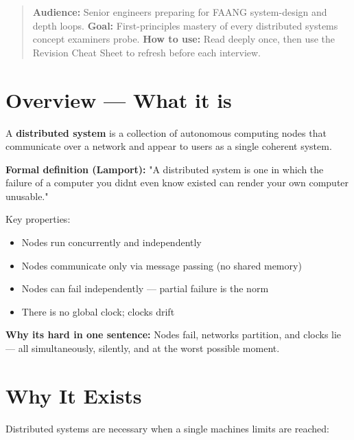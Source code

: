 \documentclass[11pt]{article}
\providecommand{\tightlist}{\setlength{\itemsep}{1pt}\setlength{\parskip}{0pt}}
\begin{document}
\makecoverpage

\thispagestyle{empty}
{\hypersetup{hidelinks}\tableofcontents}
\clearpage

\begin{quote}
\textbf{Audience:} Senior engineers preparing for FAANG system-design and depth loops.
\textbf{Goal:} First-principles mastery of every distributed systems concept examiners probe.
\textbf{How to use:} Read deeply once, then use the Revision Cheat Sheet to refresh before each interview.
\end{quote}

\section{Overview --- What it is}\label{overview--what-it-is}

A \textbf{distributed system} is a collection of autonomous computing nodes that communicate over a network and appear to users as a single coherent system.

\textbf{Formal definition (Lamport):} "A distributed system is one in which the failure of a computer you didn\textquotesingle t even know existed can render your own computer unusable."

Key properties:

\begin{itemize}
\tightlist
\item
  Nodes run concurrently and independently
\item
  Nodes communicate only via message passing (no shared memory)
\item
  Nodes can fail independently --- partial failure is the norm
\item
  There is no global clock; clocks drift
\end{itemize}

\textbf{Why it\textquotesingle s hard in one sentence:} Nodes fail, networks partition, and clocks lie --- all simultaneously, silently, and at the worst possible moment.

\section{Why It Exists}\label{why-it-exists}

Distributed systems are necessary when a single machine\textquotesingle s limits are reached:
\end{document}
